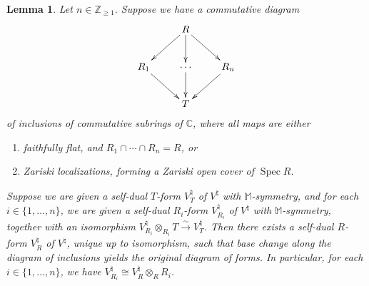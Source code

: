 \documentclass[pdftex]{sigma}
\newcommand{\bC}{\mathbb{C}}
\newcommand{\bM}{\mathbb{M}}
\newcommand{\bZ}{\mathbb{Z}}
\DeclareMathOperator{\Spec}{Spec}
\newcommand{\simto}{\overset{\sim}{\to}}
\newtheorem{lem}[thm]{Lemma}
\theoremstyle{definition}
\begin{document}
\begin{lem} \label{lem:unique-R-forms-with-monster-symmetry} Let $n \in \bZ_{\geq 1}$. Suppose we have a commutative diagram
\begin{gather*} \xymatrix{ & R \ar[rd] \ar[ld] \ar[d] \\ R_1 \ar[rd] & \cdots \ar[d] & R_n \ar[ld] \\ & T} \end{gather*}
of inclusions of commutative subrings of $\bC$, where all maps are either
\begin{enumerate}\itemsep=0pt
\item[$1)$] faithfully flat, and $R_1 \cap \cdots \cap R_n = R$, or
\item[$2)$] Zariski localizations, forming a Zariski open cover of $\Spec R$.
\end{enumerate}
Suppose we are given a self-dual $T$-form $V^\natural_T$ of $V^\natural$ with $\bM$-symmetry, and for each $i \in \{1,\ldots,n\}$, we are given a self-dual $R_i$-form $V^\natural_{R_i}$ of $V^\natural$ with $\bM$-symmetry, together with an isomorphism $V^\natural_{R_i} \otimes_{R_i} T \simto V^\natural_T$. Then there exists a self-dual $R$-form $V^\natural_R$ of $V^\natural$, unique up to isomorphism, such that base change along the diagram of inclusions yields the original diagram of forms. In particular, for each $i \in \{1, \ldots, n\}$, we have $V^\natural_{R_i} \cong V^\natural_R \otimes_{R} R_i$.
\end{lem}
\end{document}
